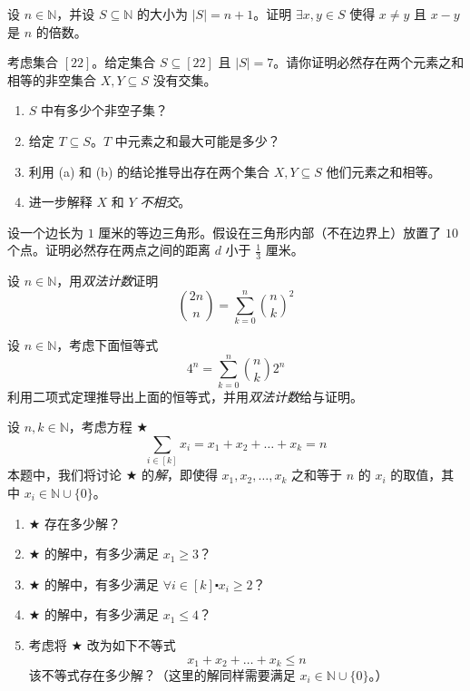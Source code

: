 \begin{exercise}
    设 $n \in \mathbb{N}$，并设 $S \subseteq \mathbb{N}$ 的大小为 $|S|=n+1$。证明 $\exists x,y \in S$ 使得 $x \ne y$ 且 $x-y$ 是 $n$ 的倍数。
\end{exercise}

\begin{exercise}
    考虑集合 $[22]$。给定集合 $S \subseteq [22]$ 且 $|S|=7$。请你证明必然存在两个元素之和相等的非空集合 $X, Y \subseteq S$ 没有交集。
    \begin{enumerate}[label=(\alph*)]
        \item $S$ 中有多少个非空子集？
        \item 给定 $T \subseteq S$。$T$ 中元素之和最大可能是多少？
        \item 利用 (a) 和 (b) 的结论推导出存在两个集合 $X,Y \subseteq S$ 他们元素之和相等。
        \item 进一步解释 $X$ 和 $Y$ \emph{不相交}。
    \end{enumerate}
\end{exercise}

\begin{exercise}
    设一个边长为 $1$ 厘米的等边三角形。假设在三角形内部（不在边界上）放置了 $10$ 个点。证明必然存在两点之间的距离 $d$ 小于 $\frac{1}{3}$ 厘米。
\end{exercise}

\begin{exercise}
    设 $n \in \mathbb{N}$，用\emph{双法计数}证明
    \[{2n \choose n} = \sum_{k=0}^{n}{n \choose k}^2\]
\end{exercise}

\begin{exercise}
    设 $n \in \mathbb{N}$，考虑下面恒等式
    \[4^n = \sum_{k=0}^{n}{n \choose k}2^n\]
    利用二项式定理推导出上面的恒等式，并用\emph{双法计数}给与证明。
\end{exercise}

\begin{exercise}
    设 $n,k \in \mathbb{N}$，考虑方程 $\bigstar$
    \[\sum_{i \in [k]}x_i = x_1 + x_2 + \dots + x_k = n\]
    本题中，我们将讨论 $\bigstar$ 的\emph{解}，即使得 $ x_1 , x_2 , \dots , x_k$ 之和等于 $n$ 的 $x_i$ 的取值，其中 $x_i \in \mathbb{N} \cup \{0\}$。
    \begin{enumerate}[label=(\alph*)]
        \item $\bigstar$ 存在多少解？
        \item $\bigstar$ 的解中，有多少满足 $x_1 \ge 3$？
        \item $\bigstar$ 的解中，有多少满足 $\forall i \in [k] \centerdot x_i \ge 2$？
        \item $\bigstar$ 的解中，有多少满足 $x_1 \le 4$？
        \item 考虑将 $\bigstar$ 改为如下不等式
              \[x_1 + x_2 + \dots + x_k \le n\]
            该不等式存在多少解？（这里的解同样需要满足 $x_i \in \mathbb{N} \cup \{0\}$。）
    \end{enumerate}
\end{exercise}

